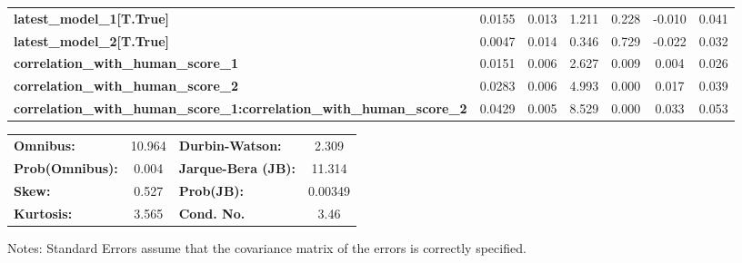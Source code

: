 \begin{center}
\begin{tabular}{lcccccc}
\textbf{latest\_model\_1[T.True]}                                              &       0.0155  &        0.013     &     1.211  &         0.228        &       -0.010    &        0.041     \\
\textbf{latest\_model\_2[T.True]}                                              &       0.0047  &        0.014     &     0.346  &         0.729        &       -0.022    &        0.032     \\
\textbf{correlation\_with\_human\_score\_1}                                    &       0.0151  &        0.006     &     2.627  &         0.009        &        0.004    &        0.026     \\
\textbf{correlation\_with\_human\_score\_2}                                    &       0.0283  &        0.006     &     4.993  &         0.000        &        0.017    &        0.039     \\
\textbf{correlation\_with\_human\_score\_1:correlation\_with\_human\_score\_2} &       0.0429  &        0.005     &     8.529  &         0.000        &        0.033    &        0.053     \\
\bottomrule
\end{tabular}
\begin{tabular}{lclc}
\textbf{Omnibus:}       & 10.964 & \textbf{  Durbin-Watson:     } &    2.309  \\
\textbf{Prob(Omnibus):} &  0.004 & \textbf{  Jarque-Bera (JB):  } &   11.314  \\
\textbf{Skew:}          &  0.527 & \textbf{  Prob(JB):          } &  0.00349  \\
\textbf{Kurtosis:}      &  3.565 & \textbf{  Cond. No.          } &     3.46  \\
\bottomrule
\end{tabular}
\end{center}

Notes: \newline
 [1] Standard Errors assume that the covariance matrix of the errors is correctly specified.